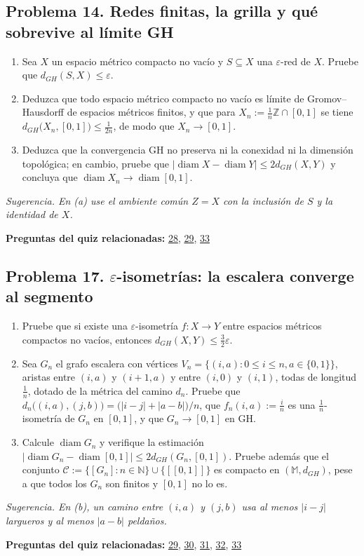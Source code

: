 \documentclass[11pt,a4paper]{article}
\begin{document}
\subsection*{\hypertarget{prob-14}{}Problema 14. Redes finitas, la grilla y qué sobrevive al límite GH}
\begin{enumerate}[label=(\alph*),leftmargin=2.2em,itemsep=2pt]
\item[(a)] Sea $X$ un espacio métrico compacto no vacío y $S\subseteq X$ una $\varepsilon$-red de $X$. Pruebe que $d_{GH}(S,X)\le\varepsilon$.
\item[(b)] Deduzca que todo espacio métrico compacto no vacío es límite de Gromov–Hausdorff de espacios métricos finitos, y que para $X_n:=\frac1n\mathbb{Z}\cap[0,1]$ se tiene $d_{GH}\bigl(X_n,[0,1]\bigr)\le\frac1{2n}$, de modo que $X_n\to[0,1]$.
\item[(c)] Deduzca que la convergencia GH no preserva ni la conexidad ni la dimensión topológica; en cambio, pruebe que $\left|\operatorname{diam} X-\operatorname{diam} Y\right|\le2 d_{GH}(X,Y)$ y concluya que $\operatorname{diam} X_n\to\operatorname{diam}[0,1]$.
\end{enumerate}
{\small\itshape Sugerencia. En (a) use el ambiente común $Z=X$ con la inclusión de $S$ y la identidad de $X$.}
\par{\small\textbf{Preguntas del quiz relacionadas:} \hyperlink{r-28}{28}, \hyperlink{r-29}{29}, \hyperlink{r-33}{33}}
\subsection*{\hypertarget{prob-17}{}Problema 17. $\varepsilon$-isometrías: la escalera converge al segmento}
\begin{enumerate}[label=(\alph*),leftmargin=2.2em,itemsep=2pt]
\item[(a)] Pruebe que si existe una $\varepsilon$-isometría $f\colon X\to Y$ entre espacios métricos compactos no vacíos, entonces $d_{GH}(X,Y)\le\frac32\varepsilon$.
\item[(b)] Sea $G_n$ el grafo escalera con vértices $V_n=\{(i,a):0\le i\le n, a\in\{0,1\}\}$, aristas entre $(i,a)$ y $(i+1,a)$ y entre $(i,0)$ y $(i,1)$, todas de longitud $\frac1n$, dotado de la métrica del camino $d_n$. Pruebe que $d_n\bigl((i,a),(j,b)\bigr)=\bigl(|i-j|+|a-b|\bigr)/n$, que $f_n(i,a):=\frac in$ es una $\frac1n$-isometría de $G_n$ en $[0,1]$, y que $G_n\to[0,1]$ en GH.
\item[(c)] Calcule $\operatorname{diam} G_n$ y verifique la estimación $\left|\operatorname{diam} G_n-\operatorname{diam}[0,1]\right|\le2 d_{GH}(G_n,[0,1])$. Pruebe además que el conjunto $\mathcal C:=\{[G_n]:n\in\mathbb{N}\}\cup\{[[0,1]]\}$ es compacto en $(\mathbb M,d_{GH})$, pese a que todos los $G_n$ son finitos y $[0,1]$ no lo es.
\end{enumerate}
{\small\itshape Sugerencia. En (b), un camino entre $(i,a)$ y $(j,b)$ usa al menos $|i-j|$ largueros y al menos $|a-b|$ peldaños.}
\par{\small\textbf{Preguntas del quiz relacionadas:} \hyperlink{r-29}{29}, \hyperlink{r-30}{30}, \hyperlink{r-31}{31}, \hyperlink{r-32}{32}, \hyperlink{r-33}{33}}
\end{document}
